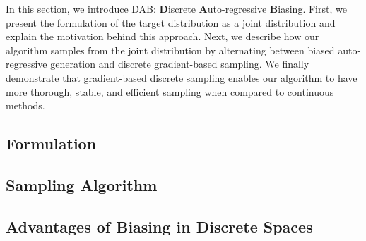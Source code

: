 In this section, we introduce DAB: \textbf{D}iscrete \textbf{A}uto-regressive \textbf{B}iasing. 
First, we present the formulation of the target distribution as a joint distribution and explain the motivation behind this approach. Next, we describe how our algorithm samples from the joint distribution by alternating between biased auto-regressive generation and discrete gradient-based sampling. We finally demonstrate that gradient-based discrete sampling enables our algorithm to have more thorough, stable, and efficient sampling when compared to continuous methods. 
\subsection{Formulation}

\subsection{Sampling Algorithm} 

% 
\subsection{Advantages of Biasing in Discrete Spaces}
